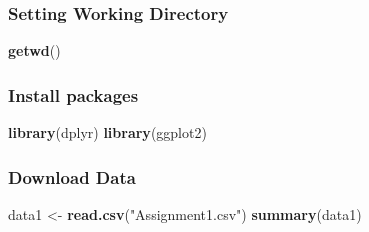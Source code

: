 \documentclass[
]{article}
\newenvironment{Shaded}{\begin{snugshade}}{\end{snugshade}}
\newcommand{\FunctionTok}[1]{\textcolor[rgb]{0.13,0.29,0.53}{\textbf{#1}}}
\newcommand{\NormalTok}[1]{#1}
\newcommand{\OtherTok}[1]{\textcolor[rgb]{0.56,0.35,0.01}{#1}}
\newcommand{\StringTok}[1]{\textcolor[rgb]{0.31,0.60,0.02}{#1}}
\begin{document}
\subsubsection{Setting Working
Directory}\label{setting-working-directory}

\begin{Shaded}
\begin{Highlighting}[]
\FunctionTok{getwd}\NormalTok{()}
\end{Highlighting}
\end{Shaded}

\subsubsection{Install packages}\label{install-packages}

\begin{Shaded}
\begin{Highlighting}[]
\FunctionTok{library}\NormalTok{(dplyr)}
\FunctionTok{library}\NormalTok{(ggplot2)}
\end{Highlighting}
\end{Shaded}

\subsubsection{Download Data}\label{download-data}

\begin{Shaded}
\begin{Highlighting}[]
\NormalTok{data1 }\OtherTok{\textless{}{-}} \FunctionTok{read.csv}\NormalTok{(}\StringTok{"Assignment1.csv"}\NormalTok{)}
\FunctionTok{summary}\NormalTok{(data1)}
\end{Highlighting}
\end{Shaded}
\end{document}
